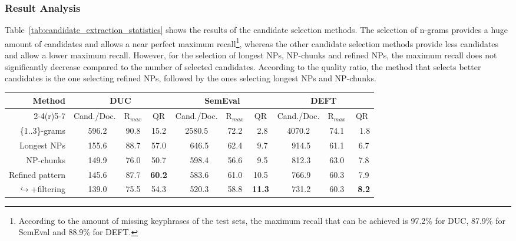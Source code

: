     \subsubsection{Result Analysis}
    \label{subsubsec:candidate_extraction_result_analysis}
      Table~\ref{tab:candidate_extraction_statistics} shows the results of the
      candidate selection methods. The selection of n-grams provides a huge
      amount of candidates and allows a near perfect maximum
      recall\footnote{According to the amount of missing keyphrases of the test
      sets, the maximum recall that can be achieved is 97.2\% for DUC, 87.9\%
      for SemEval and 88.9\% for DEFT.}, whereas the other candidate selection
      methods provide less candidates and allow a lower maximum recall. However,
      for the selection of longest NPs, NP-chunks and refined NPs, the maximum
      recall does not significantly decrease compared to the number of selected
      candidates. According to the quality ratio, the method that selects
      better candidates is the one selecting refined NPs, followed by the ones
      selecting longest NPs and NP-chunks.
      \begin{table*}
        \centering
        \begin{tabular}{@{}r@{~~}c@{~}c@{~~}c@{~}c@{~}c@{~~}c@{~}c@{~}c@{~~}c@{}}
          \toprule
          \multirow{2}{*}[-2pt]{\textbf{Method}} & \multicolumn{3}{c}{\textbf{DUC}} & \multicolumn{3}{c}{\textbf{SemEval}} & \multicolumn{3}{c}{\textbf{DEFT}}\\
          \cmidrule(r){2-4}\cmidrule(r){5-7}\cmidrule{8-10}
          & Cand./Doc. & R$_{max}$ & QR & Cand./Doc. & R$_{max}$ & QR & Cand./Doc. & R$_{max}$ & QR\\
          \midrule
          \{1..3\}-grams & $~~~$596.2 & 90.8 & 15.2 & 2580.5 & 72.2 & $~~$2.8 & 4070.2 & 74.1 & $~~~$1.8\\
          Longest NPs & $~~~$155.6 & 88.7 & 57.0 & $~~~$646.5 & 62.4 & $~~$9.7 & $~~~$914.5 & 61.1 & $~~$6.7\\
          NP-chunks & $~~~$149.9 & 76.0 & 50.7 & $~~~$598.4 & 56.6 & $~~$9.5 & $~~~$812.3 & 63.0 & $~~$7.8\\
          Refined pattern & $~~~$145.6 & 87.7 & \textbf{60.2} & $~~~$583.6 & 61.0 & 10.5 & $~~~$766.9 & 60.3 & $~~$7.9\\
          $\hookrightarrow$\hfill{}+filtering & $~~~$139.0 & 75.5 & 54.3 & $~~~$520.3 & 58.8 & \textbf{11.3} & $~~~$731.2 & 60.3 & \textbf{$~~$8.2}\\
          \bottomrule
        \end{tabular}
        \caption{Candidate selection statistics.
                 \label{tab:candidate_extraction_statistics}}
      \end{table*}

